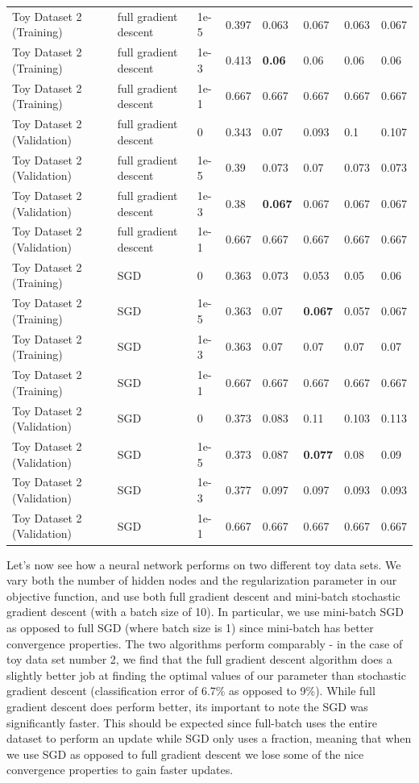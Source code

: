 \documentclass[10pt]{article}
\begin{document}
\begin{table}
\begin{tabular}{llllllll}
Toy Dataset 2 (Training) & full gradient descent & 1e-5 &   0.397 & 0.063 & 0.067 & 0.063 & 0.067 \\
Toy Dataset 2 (Training) & full gradient descent & 1e-3 &  0.413 & \bf{0.06}  & 0.06  & 0.06  & 0.06  \\
Toy Dataset 2 (Training) & full gradient descent & 1e-1 &  0.667 & 0.667 & 0.667 & 0.667 & 0.667 \\
\midrule
Toy Dataset 2 (Validation) & full gradient descent & 0 &      0.343 & 0.07  & 0.093 & 0.1   & 0.107 \\
Toy Dataset 2 (Validation) & full gradient descent & 1e-5 &   0.39  & 0.073 & 0.07  & 0.073 & 0.073 \\
Toy Dataset 2 (Validation) & full gradient descent & 1e-3 &  0.38  & \bf{0.067} & 0.067 & 0.067 & 0.067 \\
Toy Dataset 2 (Validation) & full gradient descent & 1e-1 &  0.667 & 0.667 & 0.667 & 0.667 & 0.667 \\
\midrule
Toy Dataset 2 (Training) & SGD & 0 &       0.363 & 0.073 & 0.053 & 0.05  & 0.06  \\
Toy Dataset 2 (Training) & SGD & 1e-5 &   0.363 & 0.07  & \bf{0.067} & 0.057 & 0.067 \\
Toy Dataset 2 (Training) & SGD & 1e-3 &   0.363 & 0.07  & 0.07  & 0.07  & 0.07  \\
Toy Dataset 2 (Training) & SGD & 1e-1 &   0.667 & 0.667 & 0.667 & 0.667 & 0.667 \\
\midrule
Toy Dataset 2 (Validation) & SGD & 0 &       0.373 & 0.083 & 0.11  & 0.103 & 0.113 \\
Toy Dataset 2 (Validation) & SGD & 1e-5 &   0.373 & 0.087 & \bf{0.077} & 0.08  & 0.09  \\
Toy Dataset 2 (Validation) & SGD & 1e-3 &   0.377 & 0.097 & 0.097 & 0.093 & 0.093 \\
Toy Dataset 2 (Validation) & SGD & 1e-1 &   0.667 & 0.667 & 0.667 & 0.667 & 0.667 \\
\bottomrule
\end{tabular}
\end{table}

Let's now see how a neural network performs on two different toy data sets. We vary both the number of hidden nodes and the regularization parameter in our objective function, and use both full gradient descent and mini-batch stochastic gradient descent (with a batch size of 10). In particular, we use mini-batch SGD as opposed to full SGD (where batch size is 1) since mini-batch  has better convergence properties. The two algorithms perform comparably - in the case of toy data set number 2, we find that the full gradient descent algorithm does a slightly better job at finding the optimal values of our parameter than stochastic gradient descent (classification error of 6.7\% as opposed to 9\%). While full gradient descent does perform better, its important to note the SGD was significantly faster. This should be expected since full-batch uses the entire dataset to perform an update while SGD only uses a fraction, meaning that when we use SGD as opposed to full gradient descent we lose some of the nice convergence properties to gain faster updates. 
\end{document}
